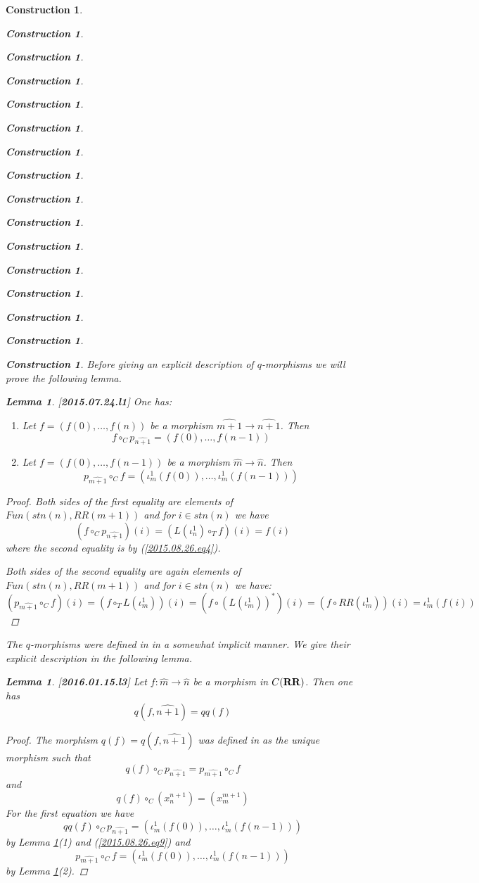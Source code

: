\documentclass[12pt]{amsart}
\newtheorem{lemma}[proposition]{Lemma}
\newtheorem{construction}[proposition]{Construction}
\newcommand{\llabel}[1]{\label{#1}[{\bf #1}]}
\newcommand{\sr}{\rightarrow}
\newcommand{\wh}{\widehat}
\newcommand{\mbind}[1]{{#1^*}}
\newcommand{\RR}{{\bf RR}}
\begin{document}
\begin{construction}
\begin{construction}
\begin{construction}
\begin{construction}
\begin{construction}
\begin{construction}
\begin{construction}
\begin{construction}
\begin{construction}
\begin{construction}
\begin{construction}
\begin{construction}
\begin{construction}
\begin{construction}
\begin{construction}
\begin{construction}
Before giving an explicit description of $q$-morphisms we will prove the following lemma.
%
\begin{lemma}
\llabel{2015.07.24.l1}
One has:
%
\begin{enumerate}
\item Let $f=(f(0),\dots,f(n))$ be a morphism $\wh{m+1}\sr\wh{n+1}$. Then 
%
$$f\circ_C p_{\wh{n+1}}=(f(0),\dots,f(n-1))$$
%
\item Let $f=(f(0),\dots,f(n-1))$ be a morphism $\wh{m}\sr \wh{n}$. Then 
%
$$p_{\wh{m+1}}\circ_C f=(\iota_m^1(f(0)),\dots,\iota_m^1(f(n-1)))$$
%
\end{enumerate}
\end{lemma}
%
\begin{proof}
Both sides of the first equality are elements of $Fun(stn(n), RR(m+1))$ and for $i\in stn(n)$ we have
%
$$(f\circ_C p_{\wh{n+1}})(i)=(L(\iota_{n}^1)\circ_T f)(i)=f(i)$$
%
where the second equality is by (\ref{2015.08.26.eq4}). 

Both sides of the second equality are again elements of $Fun(stn(n), RR(m+1))$ and for $i\in stn(n)$ we have:  
%
$$(p_{\wh{m+1}}\circ_C f)(i)=(f\circ_T L(\iota_{m}^1))(i)=(f\circ \mbind{(L(\iota_{m}^1))})(i)=(f\circ RR(\iota_{m}^1))(i)=\iota_{m}^1(f(i))$$
%
\end{proof}
%
The $q$-morphisms were defined in \cite{LandC} in a somewhat implicit manner. We give their explicit description in the following lemma.
%
\begin{lemma}
\llabel{2016.01.15.l3}
Let $f:\wh{m}\sr \wh{n}$ be a morphism in $C(\RR)$. Then one has
%
$$q(f,\wh{n+1})=qq(f)$$
%
\end{lemma}
%
\begin{proof}
The morphism $q(f)=q(f,\wh{n+1})$ was defined in \cite{LandC} as the unique morphism such that
%
$$q(f)\circ_C p_{\wh{n+1}}=p_{\wh{m+1}}\circ_C f$$
%
and
%
$$q(f)\circ_C (x_n^{n+1})=(x_m^{m+1})$$
%
For the first equation we have
%
$$qq(f)\circ_C p_{\wh{n+1}}=(\iota_m^1(f(0)),\dots,\iota_m^1(f(n-1)))$$
%
by Lemma \ref{2015.07.24.l1}(1) and (\ref{2015.08.26.eq9}) and
%
$$p_{\wh{m+1}}\circ_C f = (\iota_m^1(f(0)),\dots,\iota_m^1(f(n-1)))$$
%
by Lemma \ref{2015.07.24.l1}(2).


\end{proof}
\end{construction}
\end{construction}
\end{construction}
\end{construction}
\end{construction}
\end{construction}
\end{construction}
\end{construction}
\end{construction}
\end{construction}
\end{construction}
\end{construction}
\end{construction}
\end{construction}
\end{construction}
\end{construction}
\end{document}
